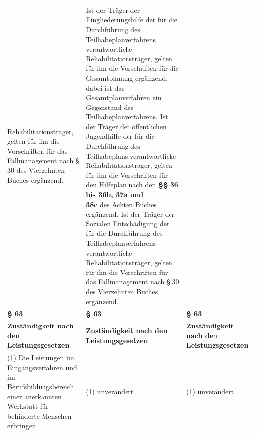\documentclass[10pt,a4paper,landscape]{article}
\begin{document}
\begin{longtable}{|L{8.2cm}|L{8.2cm}|L{8.2cm}|}
Rehabilitationsträger, gelten für ihn die  \newline Vorschriften für das Fallmanagement nach  \newline \S{} 30 des Vierzehnten Buches ergänzend. & Ist der Träger der Eingliederungshilfe der  \newline für die Durchführung des  \newline Teilhabeplanverfahrens verantwortliche  \newline Rehabilitationsträger, gelten für ihn die  \newline Vorschriften für die Gesamtplanung  \newline ergänzend; dabei ist das  \newline Gesamtplanverfahren ein Gegenstand des  \newline Teilhabeplanverfahrens. Ist der Träger der  \newline öffentlichen Jugendhilfe der für die  \newline Durchführung des Teilhabeplans  \newline verantwortliche Rehabilitationsträger,  \newline gelten für ihn die Vorschriften für den  \newline Hilfeplan nach den \textbf{\S{}\S{} 36 bis 36b, 37a und  \newline 38c} des Achten Buches ergänzend. Ist der  \newline Träger der Sozialen Entschädigung der für  \newline die Durchführung des  \newline Teilhabeplanverfahrens verantwortliche  \newline Rehabilitationsträger, gelten für ihn die  \newline Vorschriften für das Fallmanagement nach  \newline \S{} 30 des Vierzehnten Buches ergänzend. \\
\hhline{|---|}
\textbf{\S{} 63} & \textbf{\S{} 63} & \textbf{\S{} 63} \\
\hhline{|---|}
\textbf{Zuständigkeit nach den Leistungsgesetzen} & \textbf{Zuständigkeit nach den Leistungsgesetzen} & \textbf{Zuständigkeit nach den Leistungsgesetzen} \\
\hhline{|---|}
(1) Die Leistungen im Eingangsverfahren  \newline und im Berufsbildungsbereich einer  \newline anerkannten Werkstatt für behinderte  \newline Menschen erbringen & (1) unverändert & (1) unverändert \\

\end{longtable}
\end{document}
